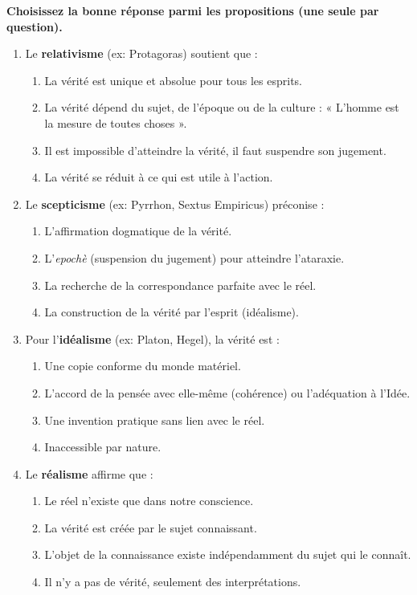 \documentclass[11pt]{article}
\begin{document}
\begin{exercice}
\textbf{Choisissez la bonne réponse parmi les propositions (une seule par question).}
\begin{enumerate}
    \item Le \textbf{relativisme} (ex: Protagoras) soutient que :
    \begin{enumerate}
        \item La vérité est unique et absolue pour tous les esprits.
        \item La vérité dépend du sujet, de l'époque ou de la culture : « L'homme est la mesure de toutes choses ».
        \item Il est impossible d'atteindre la vérité, il faut suspendre son jugement.
        \item La vérité se réduit à ce qui est utile à l'action.
    \end{enumerate}
    \item Le \textbf{scepticisme} (ex: Pyrrhon, Sextus Empiricus) préconise :
    \begin{enumerate}
        \item L'affirmation dogmatique de la vérité.
        \item L'\textit{epochè} (suspension du jugement) pour atteindre l'ataraxie.
        \item La recherche de la correspondance parfaite avec le réel.
        \item La construction de la vérité par l'esprit (idéalisme).
    \end{enumerate}
    \item Pour l'\textbf{idéalisme} (ex: Platon, Hegel), la vérité est :
    \begin{enumerate}
        \item Une copie conforme du monde matériel.
        \item L'accord de la pensée avec elle-même (cohérence) ou l'adéquation à l'Idée.
        \item Une invention pratique sans lien avec le réel.
        \item Inaccessible par nature.
    \end{enumerate}
    \item Le \textbf{réalisme} affirme que :
    \begin{enumerate}
        \item Le réel n'existe que dans notre conscience.
        \item La vérité est créée par le sujet connaissant.
        \item L'objet de la connaissance existe indépendamment du sujet qui le connaît.
        \item Il n'y a pas de vérité, seulement des interprétations.
    \end{enumerate}
\end{enumerate}
\end{exercice}
\end{document}
